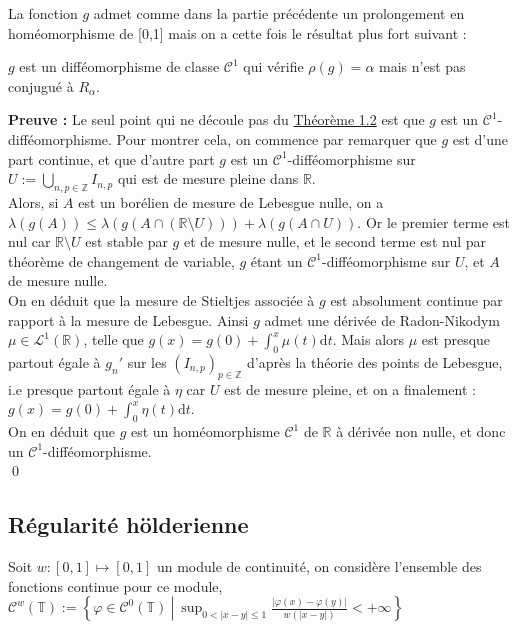 \documentclass[11pt,a4paper]{article}
\begin{document}
La fonction $g$ admet comme dans la partie précédente un prolongement en homéomorphisme de [0,1] mais on a cette fois le résultat plus fort suivant :

\begin{theorem}
$g$ est un difféomorphisme de classe $\mathcal{C}^1$ qui vérifie $\rho(g)=\alpha$ mais n'est pas conjugué à $R_\alpha$.
\end{theorem}


\textbf{Preuve :} Le seul point qui ne découle pas du \hyperref[th:cont]{Théorème 1.2} est que $g$ est un $\mathcal{C}^1$-difféomorphisme. Pour montrer cela, on commence par remarquer que $g$ est d'une part continue, et que d'autre part $g$ est un $\mathcal{C}^1$-difféomorphisme sur $\displaystyle U := \bigcup_{n,p\in \mathbb{Z}} I_{n,p}$ qui est de mesure pleine dans $\mathbb{R}$. \\
Alors, si $A$ est un borélien de mesure de Lebesgue nulle, on a $\lambda(g(A)) \leq \lambda(g(A\cap (\mathbb{R} \setminus U))) + \lambda(g(A\cap U))$. 
Or le premier terme est nul car $\mathbb{R} \setminus U$ est stable par $g$ et de mesure nulle, et le second terme est nul par théorème de changement de variable, $g$ étant un $\mathcal{C}^1$-difféomorphisme sur $ U $, et $A$ de mesure nulle. \\

On en déduit que la mesure de Stieltjes associée à $g$ est absolument continue par rapport à la mesure de Lebesgue. Ainsi $g$ admet une dérivée de Radon-Nikodym $\mu \in \mathcal{L}^1(\mathbb{R})$, telle que $g(x) = g(0) + \displaystyle \int_0^x \mu(t) \mathrm{d}t$. Mais alors $\mu$ est presque partout égale à $g_n'$ sur les $(I_{n,p})_{p\in \mathbb{Z}}$ d'après la théorie des points de Lebesgue, i.e presque partout égale à $\eta$ car $U$ est de mesure pleine, et on a finalement : $g(x) = g(0) + \displaystyle \int_0^x \eta(t) \mathrm{d}t$. \\
On en déduit que $g$ est un homéomorphisme $\mathcal{C}^1$ de $\mathbb{R}$ à dérivée non nulle, et donc un $\mathcal{C}^1$-difféomorphisme. \\ \qed

\subsection{Régularité hölderienne}

Soit $w:[0, 1] \mapsto [0, 1]$ un module de continuité, on considère l'ensemble des fonctions continue pour ce module, $\displaystyle\mathcal{C}^w(\mathbb{T}) := \left\{ \varphi \in \mathcal{C}^0(\mathbb{T}) \ \left| \ \sup_{ 0<|x-y|\leq 1}  \frac{|\varphi(x)-\varphi(y)|}{w(|x-y|)} < +\infty \right. \right\} $ \\
\end{document}
